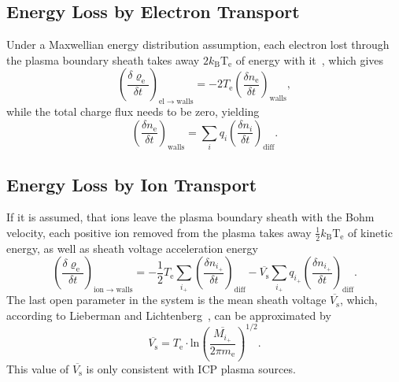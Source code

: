 \subsection{Energy Loss by Electron Transport}\label{subsec:03-energy-loss-by-electron-transport}
Under a Maxwellian energy distribution assumption, each electron lost through the plasma boundary sheath takes away
$2k_{\mathrm{B}}\mathrm{T_e}$ of energy with it~\cite{lieberman_principles_2005}, which gives
\begin{equation}
    \left( \frac{\delta \varrho_{\mathrm{e}}}{\delta t} \right)_{\mathrm{el \rightarrow walls}} =
    - 2 T_{\mathrm{e}} \left( \frac{\delta n_{\mathrm{e}}}{\delta t} \right)_{\mathrm{walls}}
    ,
\end{equation}
while the total charge flux needs to be zero, yielding
\begin{equation}
    \left( \frac{\delta n_{\mathrm{e}}}{\delta t} \right)_{\mathrm{walls}} =
    \sum_{i} q_{i} \left( \frac{\delta n_{i}}{\delta t} \right)_{\mathrm{diff}}.
\end{equation}

\subsection{Energy Loss by Ion Transport}\label{subsec:03-energy-loss-by-ion-transport}
If it is assumed, that ions leave the plasma boundary sheath with the Bohm velocity, each positive ion removed from
the plasma takes away $\frac{1}{2} k_{\mathrm{B}} \mathrm{T_e}$ of kinetic energy, as well as sheath voltage
acceleration energy~\cite{lieberman_principles_2005}
\begin{equation}
    \left( \frac{\delta \varrho_{\mathrm{e}}}{\delta t} \right)_{\mathrm{ion \rightarrow walls}} =
    - \frac{1}{2} T_{\mathrm{e}} \sum_{i_{+}} \left( \frac{\delta n_{i_{+}}}{\delta t} \right)_{\mathrm{diff}}
    - \overline{V_{\mathrm{s}}} \sum_{i_{+}} q_{i_{+}} \left( \frac{\delta n_{i_{+}}}{\delta t} \right)_{\mathrm{diff}}.
\end{equation}
The last open parameter in the system is the mean sheath voltage $\overline{V_{\mathrm{s}}}$, which,
according to Lieberman and Lichtenberg~\cite{lieberman_principles_2005}, can be approximated by
\begin{equation}
    \overline{V_{\mathrm{s}}} =
    T_{\mathrm{e}} \cdot \mathrm{ln} \left( \frac{\overline{M_{i_{+}}}}{2 \pi m_{\mathrm{e}}} \right)^{1/2}.
\end{equation}
This value of $\overline{V_{\mathrm{s}}}$ is only consistent with ICP plasma sources.


